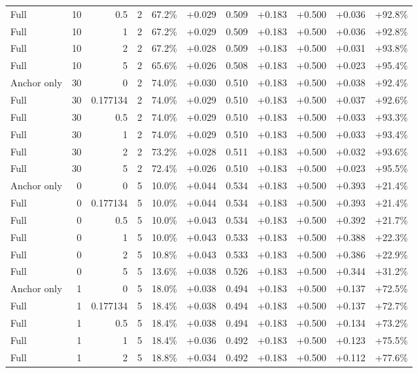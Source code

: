 \begin{table}[htbp]
\begin{tabular}{lrrrccccccc}
Full & 10 & 0.5 & 2 & 67.2\% & +0.029 & 0.509 & +0.183 & +0.500 & +0.036 & +92.8\% \\
Full & 10 & 1 & 2 & 67.2\% & +0.029 & 0.509 & +0.183 & +0.500 & +0.036 & +92.8\% \\
Full & 10 & 2 & 2 & 67.2\% & +0.028 & 0.509 & +0.183 & +0.500 & +0.031 & +93.8\% \\
Full & 10 & 5 & 2 & 65.6\% & +0.026 & 0.508 & +0.183 & +0.500 & +0.023 & +95.4\% \\
Anchor only & 30 & 0 & 2 & 74.0\% & +0.030 & 0.510 & +0.183 & +0.500 & +0.038 & +92.4\% \\
Full & 30 & 0.177134 & 2 & 74.0\% & +0.029 & 0.510 & +0.183 & +0.500 & +0.037 & +92.6\% \\
Full & 30 & 0.5 & 2 & 74.0\% & +0.029 & 0.510 & +0.183 & +0.500 & +0.033 & +93.3\% \\
Full & 30 & 1 & 2 & 74.0\% & +0.029 & 0.510 & +0.183 & +0.500 & +0.033 & +93.4\% \\
Full & 30 & 2 & 2 & 73.2\% & +0.028 & 0.511 & +0.183 & +0.500 & +0.032 & +93.6\% \\
Full & 30 & 5 & 2 & 72.4\% & +0.026 & 0.510 & +0.183 & +0.500 & +0.023 & +95.5\% \\
Anchor only & 0 & 0 & 5 & 10.0\% & +0.044 & 0.534 & +0.183 & +0.500 & +0.393 & +21.4\% \\
Full & 0 & 0.177134 & 5 & 10.0\% & +0.044 & 0.534 & +0.183 & +0.500 & +0.393 & +21.4\% \\
Full & 0 & 0.5 & 5 & 10.0\% & +0.043 & 0.534 & +0.183 & +0.500 & +0.392 & +21.7\% \\
Full & 0 & 1 & 5 & 10.0\% & +0.043 & 0.533 & +0.183 & +0.500 & +0.388 & +22.3\% \\
Full & 0 & 2 & 5 & 10.8\% & +0.043 & 0.533 & +0.183 & +0.500 & +0.386 & +22.9\% \\
Full & 0 & 5 & 5 & 13.6\% & +0.038 & 0.526 & +0.183 & +0.500 & +0.344 & +31.2\% \\
Anchor only & 1 & 0 & 5 & 18.0\% & +0.038 & 0.494 & +0.183 & +0.500 & +0.137 & +72.5\% \\
Full & 1 & 0.177134 & 5 & 18.4\% & +0.038 & 0.494 & +0.183 & +0.500 & +0.137 & +72.7\% \\
Full & 1 & 0.5 & 5 & 18.4\% & +0.038 & 0.494 & +0.183 & +0.500 & +0.134 & +73.2\% \\
Full & 1 & 1 & 5 & 18.4\% & +0.036 & 0.492 & +0.183 & +0.500 & +0.123 & +75.5\% \\
Full & 1 & 2 & 5 & 18.8\% & +0.034 & 0.492 & +0.183 & +0.500 & +0.112 & +77.6\% \\

\end{tabular}
\end{table}
